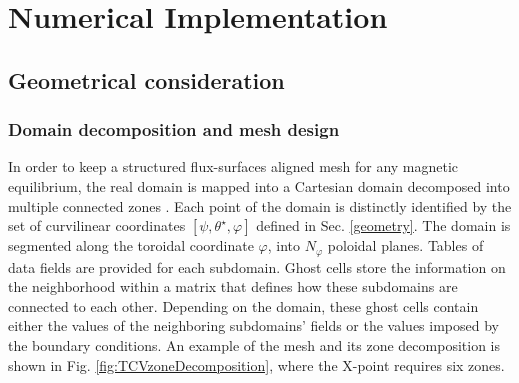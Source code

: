 \chapter{Numerical Implementation}

\section{Geometrical consideration}

\subsection{Domain decomposition and mesh design}

In order to keep a structured flux-surfaces aligned mesh for any magnetic equilibrium, the real domain is mapped into a Cartesian domain decomposed into multiple connected zones \cite{tamain2016tokam3x}. Each point of the domain is distinctly identified by the set of curvilinear coordinates $[\psi, \theta^{\star}, \varphi]$ defined in Sec. \ref{geometry}. The domain is segmented along the toroidal coordinate $\varphi$, into $N_{\varphi}$ poloidal planes. Tables of data fields are provided for each subdomain. Ghost cells store the information on the neighborhood within a matrix that defines how these subdomains are connected to each other. Depending on the domain, these ghost cells contain either the values of the neighboring subdomains' fields or the values imposed by the boundary conditions. An example of the mesh and its zone decomposition is shown in Fig. \ref{fig:TCVzoneDecomposition}, where the X-point requires six zones. \newline

